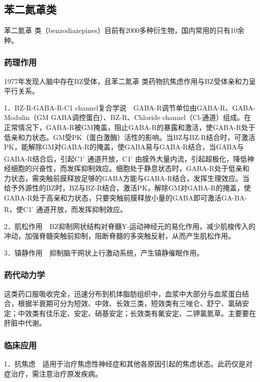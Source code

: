 \subsection{苯二氮䓬类}

苯二氮䓬
类（benzodiazepines）目前有2000多种衍生物，国内常用的只有10余种。

\subsubsection{药理作用}

1977年发现人脑中存在BZ受体，且苯二氮䓬
类药物抗焦虑作用与BZ受体亲和力呈平行关系。

1．BZ-R-GABA-R-C1
channel复合学说　GABA-R调节单位由GABA-R、GABA-Modulin（GM
GABA调控蛋白）、BZ-R、Chloride
channel（Cl-通道）组成。在正常情况下，GABA-R被GM掩盖，阻止GABA-R的暴露和激活，使GABA-R处于低亲和力状态。GM受PK（蛋白激酶）活性的影响。当BZ与BZ-R结合时，可激活PK，能解除GM对GABA-R的掩盖，使GABA易与GABA-R结合，当GABA与GABA-R结合后，引起C1\textsuperscript{-}
通道开放，C1\textsuperscript{-}
由膜外大量内流，引起超极化，降低神经细胞的兴奋性，而发挥抑制效应。细胞处于静息状态时，GABA-R处于低亲和力状态，需突触前膜释放足够的GABA方能与GABA-R结合，发挥生理效应。当给予外源性的BZ时，BZ与BZ-R结合，激活PK，解除GM对GABA-R的掩盖，使GABA-R处于高亲和力状态，只要突触前膜释放小量的GABA即可激活GA-BA-R，使C1\textsuperscript{-}
通道开放，而发挥抑制效应。

2．肌松作用　BZ抑制网状结构对脊髓Y-运动神经元的易化作用，减少肌梭传入的冲动，加强脊髓突触前抑制，阻断脊髓的多突触反射，从而产生肌松作用。

3．镇静作用　抑制脑干网状上行激动系统，产生镇静催眠作用。

\subsubsection{药代动力学}

这类药口服吸收完全，迅速分布到机体脂肪组织中，血浆中大部分与血浆蛋白结合，根据半衰期可分为短效、中效、长效三类，短效类有三唑仑、舒宁、氯硝安定；中效类有佳乐定、安定、硝基安定；长效类有氟安定、二钾氯氮草。主要要在肝脏中代谢。

\subsubsection{临床应用}

1．抗焦虑　适用于治疗焦虑性神经症和其他各原因引起的焦虑状态。此药仅是对症治疗，需注意治疗原发疾病。

